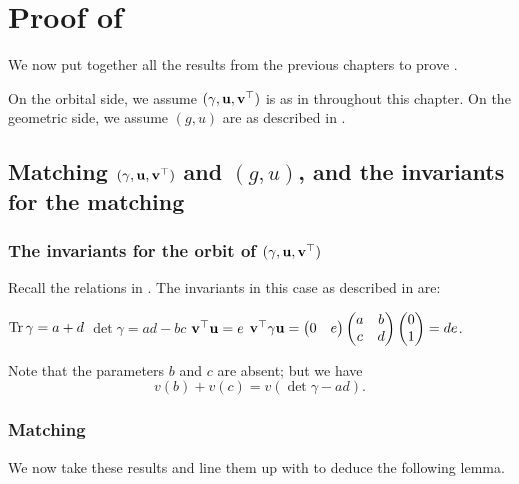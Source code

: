 \chapter{Proof of }
\label{ch:finale}
We now put together all the results from the previous chapters to
prove .

On the orbital side, we assume ${(\gamma, \mathbf u, \mathbf v^\top)}$ is as in  throughout this chapter.
On the geometric side, we assume $(g,u)$ are as described in .

\section{Matching ${(\gamma, \mathbf u, \mathbf v^\top)}$ and $(g,u)$, and the invariants for the matching}
\subsection{The invariants for the orbit of ${(\gamma, \mathbf u, \mathbf v^\top)}$}
Recall the relations in .
The invariants in this case as described in  are:
\begin{itemize}
  \ii $\operatorname{Tr} \gamma = a + d$
  \ii $\det \gamma = ad - bc$
  \ii $\mathbf v^\top \mathbf u = e$
  \ii $\mathbf v^\top \gamma \mathbf u = \begin{pmatrix} 0 & e \end{pmatrix}
  \begin{pmatrix} a & b \\ c & d \end{pmatrix} \begin{pmatrix} 0 \\ 1 \end{pmatrix} = de$.
\end{itemize}
Note that the parameters $b$ and $c$ are absent; but we have
\[ v(b) + v(c) = v(\det \gamma - a d). \]

\subsection{Matching}
We now take these results and line them up with 
to deduce the following lemma.

